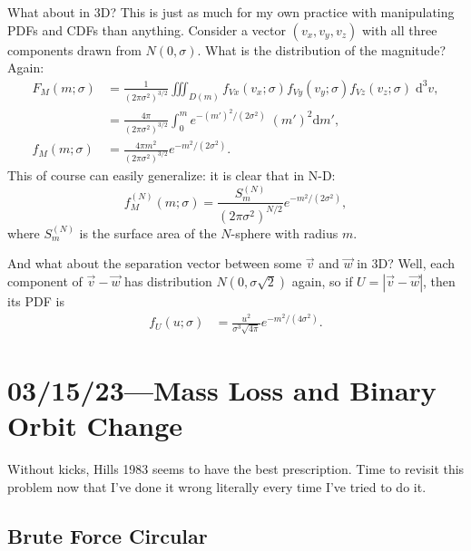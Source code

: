 \documentclass[12pt]{article}
\newcommand*{\abs}[1]{\left|#1\right|}
\newcommand*{\p}[1]{\left(#1\right)}
\begin{document}
What about in 3D\@? This is just as much for my own practice with manipulating
PDFs and CDFs than anything. Consider a vector $\p{v_x, v_y, v_z}$ with all
three components drawn from $N\p{0, \sigma}$. What is the distribution of the
magnitude? Again:
\begin{align}
    F_M(m; \sigma)
        &= \frac{1}{(2\pi \sigma^2)^{3/2}}\iiint_{D(m)}
            f_{Vx}\p{v_x; \sigma}
            f_{Vy}\p{v_y; \sigma}
            f_{Vz}\p{v_z; \sigma}\;\mathrm{d}^3v,\\
        &= \frac{4\pi}{(2\pi \sigma^2)^{3/2}}\int_0^m
            e^{-(m')^2/(2\sigma^2)}\;(m')^2\mathrm{d}m',\\
    f_M(m; \sigma) &= \frac{4\pi m^2}{\p{2\pi \sigma^2}^{3/2}}
            e^{-m^2/(2\sigma^2)}.
\end{align}
This of course can easily generalize: it is clear that in N-D\@:
\begin{equation}
    f^{(N)}_M(m; \sigma)
        = \frac{S^{(N)}_m}{\p{2\pi \sigma^2}^{N / 2}}
            e^{-m^2 / (2\sigma^2)},
\end{equation}
where $S^{(N)}_m$ is the surface area of the $N$-sphere with radius $m$.

And what about the separation vector between some $\vec{v}$ and $\vec{w}$ in
3D\@? Well, each component of $\vec{v} - \vec{w}$ has distribution $N\p{0,
\sigma \sqrt{2}}$ again, so if $U = \abs{\vec{v} - \vec{w}}$, then its PDF is
\begin{align}
    f_U(u; \sigma)
        &= \frac{u^2}{\sigma^3\sqrt{4\pi}}
            e^{-m^2 / (4\sigma^2)}.
\end{align}

\section{03/15/23---Mass Loss and Binary Orbit Change}

Without kicks, Hills 1983 seems to have the best prescription. Time to revisit
this problem now that I've done it wrong literally every time I've tried to do
it.

\subsection{Brute Force Circular}
\end{document}
